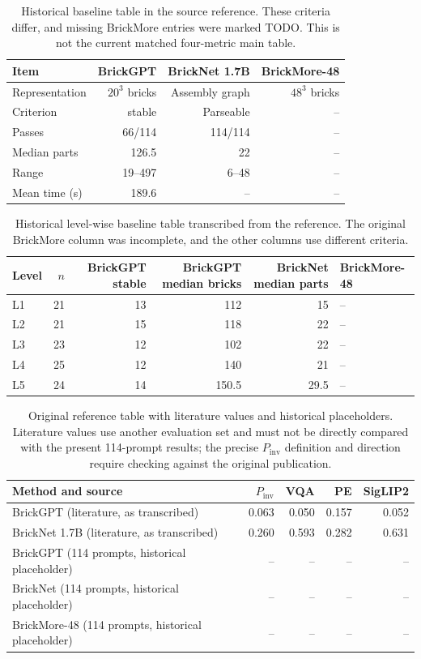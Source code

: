 \begin{table}[!htbp]\centering\small
\begin{tabular}{lrrr}\toprule
Item & BrickGPT & BrickNet 1.7B & BrickMore-48 \\ \midrule
Representation & $20^3$ bricks & Assembly graph & $48^3$ bricks \\
Criterion & stable & Parseable & -- \\
Passes & 66/114 & 114/114 & -- \\
Median parts & 126.5 & 22 & -- \\
Range & 19--497 & 6--48 & -- \\
Mean time (s) & 189.6 & -- & -- \\
\bottomrule\end{tabular}
\caption{Historical baseline table in the source reference. These criteria differ, and missing BrickMore entries were marked TODO. This is not the current matched four-metric main table.}
\end{table}

\begin{table}[!htbp]\centering\small
\begin{tabular}{lrrrrl}\toprule
Level & $n$ & BrickGPT stable & BrickGPT median bricks & BrickNet median parts & BrickMore-48 \\ \midrule
L1 & 21 & 13 & 112 & 15 & -- \\
L2 & 21 & 15 & 118 & 22 & -- \\
L3 & 23 & 12 & 102 & 22 & -- \\
L4 & 25 & 12 & 140 & 21 & -- \\
L5 & 24 & 14 & 150.5 & 29.5 & -- \\
\bottomrule\end{tabular}
\caption{Historical level-wise baseline table transcribed from the reference. The original BrickMore column was incomplete, and the other columns use different criteria.}
\end{table}

\begin{table}[!htbp]\centering\small
\begin{tabular}{lrrrr}\toprule
Method and source & $P_{\mathrm{inv}}$ & VQA & PE & SigLIP2 \\ \midrule
BrickGPT (literature, as transcribed) & 0.063 & 0.050 & 0.157 & 0.052 \\
BrickNet 1.7B (literature, as transcribed) & 0.260 & 0.593 & 0.282 & 0.631 \\
BrickGPT (114 prompts, historical placeholder) & -- & -- & -- & -- \\
BrickNet (114 prompts, historical placeholder) & -- & -- & -- & -- \\
BrickMore-48 (114 prompts, historical placeholder) & -- & -- & -- & -- \\
\bottomrule\end{tabular}
\caption{Original reference table with literature values and historical placeholders. Literature values use another evaluation set and must not be directly compared with the present 114-prompt results; the precise $P_{\mathrm{inv}}$ definition and direction require checking against the original publication.}
\end{table}
\FloatBarrier
